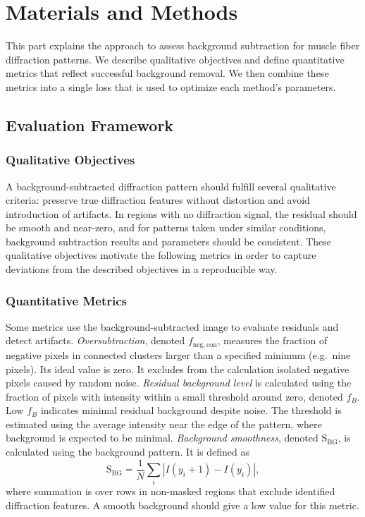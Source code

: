 \documentclass[journal,article,submit,moreauthors]{Definitions/mdpi}
\begin{document}
\section{Materials and Methods}
\label{sec:approach}

This part explains the approach to assess background subtraction for muscle fiber diffraction patterns. We describe qualitative objectives and define quantitative metrics that reflect successful background removal. We then combine these metrics into a single loss that is used to optimize each method's parameters.


\subsection{Evaluation Framework}
\label{sec:evaluation_framework}


\subsubsection{Qualitative Objectives}

A background-subtracted diffraction pattern should fulfill several qualitative criteria: preserve true diffraction features without distortion and avoid introduction of artifacts. In regions with no diffraction signal, the residual should be smooth and near-zero, and for patterns taken under similar conditions, background subtraction results and parameters should be consistent. These qualitative objectives motivate the following metrics in order to capture deviations from the described objectives in a reproducible way.

\subsubsection{Quantitative Metrics}

Some metrics use the background-subtracted image to evaluate residuals and detect artifacts. \textit{Oversubtraction}, denoted $f_{\mathrm{neg,con}}$, measures the fraction of negative pixels in connected clusters larger than a specified minimum (e.g.\ nine pixels). Its ideal value is zero. It excludes from the calculation isolated negative pixels caused by random noise. \textit{Residual background level} is calculated using the fraction of pixels with intensity within a small threshold around zero, denoted $f_{B}$. Low $f_{B}$ indicates minimal residual background despite noise. The threshold is estimated using the average intensity near the edge of the pattern, where background is expected to be minimal. \textit{Background smoothness}, denoted $\mathrm{S}_{\mathrm{BG}}$, is calculated using the background pattern. It is defined as
\begin{equation}
\mathrm{S}_{\mathrm{BG}} =
\frac{1}{N} \sum_i \left| I(y_i + 1) - I(y_i) \right|,
\end{equation}
where summation is over rows in non-masked regions that exclude identified diffraction features. A smooth background should give a low value for this metric.
\end{document}
